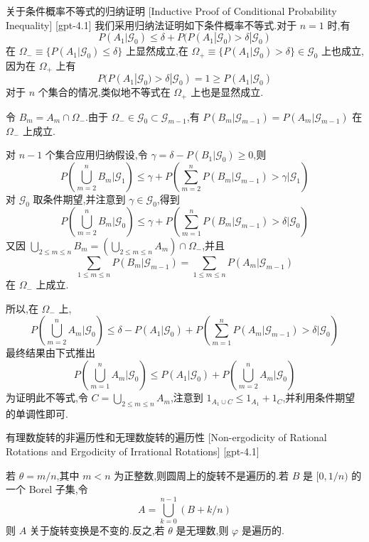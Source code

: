 \documentclass[UTF8]{ctexart}
\begin{document}
    \begin{prf}
        {关于条件概率不等式的归纳证明}
        [Inductive Proof of Conditional Probability Inequality]
        [gpt-4.1]
        我们采用归纳法证明如下条件概率不等式.对于 $n=1$ 时,有
\[
P ( A_1 | \mathcal{G}_0 ) \leq \delta + P ( P ( A_1 | \mathcal{G}_0 ) > \delta | \mathcal{G}_0 )
\]
在 $\Omega_{-} \equiv \{ P ( A_1 | \mathcal{G}_0 ) \leq \delta \}$ 上显然成立,在 $\Omega_{+} \equiv \{ P ( A_1 | \mathcal{G}_0 ) > \delta \} \in \mathcal{G}_0$ 上也成立,因为在 $\Omega_{+}$ 上有
\[
P ( P ( A_1 | \mathcal{G}_0 ) > \delta | \mathcal{G}_0 ) = 1 \geq P ( A_1 | \mathcal{G}_0 )
\]
对于 $n$ 个集合的情况,类似地不等式在 $\Omega_{+}$ 上也是显然成立.

令 $B_m = A_m \cap \Omega_{-}$.由于 $\Omega_{-} \in \mathcal{G}_0 \subset \mathcal{G}_{m-1}$,有 $P ( B_m | \mathcal{G}_{m-1} ) = P ( A_m | \mathcal{G}_{m-1} )$ 在 $\Omega_{-}$ 上成立.

对 $n-1$ 个集合应用归纳假设,令 $\gamma = \delta - P ( B_1 | \mathcal{G}_0 ) \geq 0$,则
\[
P \left( \bigcup_{m=2}^n B_m \bigg| \mathcal{G}_1 \right) \leq \gamma + P \left( \sum_{m=2}^n P ( B_m | \mathcal{G}_{m-1} ) > \gamma \bigg| \mathcal{G}_1 \right)
\]
对 $\mathcal{G}_0$ 取条件期望,并注意到 $\gamma \in \mathcal{G}_0$,得到
\[
P \left( \bigcup_{m=2}^n B_m \bigg| \mathcal{G}_0 \right) \leq \gamma + P \left( \sum_{m=1}^n P ( B_m | \mathcal{G}_{m-1} ) > \delta \bigg| \mathcal{G}_0 \right)
\]
又因 $\bigcup_{2 \leq m \leq n} B_m = \left( \bigcup_{2 \leq m \leq n} A_m \right) \cap \Omega_{-}$,并且
\[
\sum_{1 \leq m \leq n} P ( B_m | \mathcal{G}_{m-1} ) = \sum_{1 \leq m \leq n} P ( A_m | \mathcal{G}_{m-1} )
\]
在 $\Omega_{-}$ 上成立.

所以,在 $\Omega_{-}$ 上,
\[
P \left( \bigcup_{m=2}^n A_m \bigg| \mathcal{G}_0 \right) \leq \delta - P ( A_1 | \mathcal{G}_0 ) + P \left( \sum_{m=1}^n P ( A_m | \mathcal{G}_{m-1} ) > \delta \bigg| \mathcal{G}_0 \right)
\]
最终结果由下式推出
\[
P \left( \bigcup_{m=1}^n A_m \bigg| \mathcal{G}_0 \right) \leq P ( A_1 | \mathcal{G}_0 ) + P \left( \bigcup_{m=2}^n A_m \bigg| \mathcal{G}_0 \right)
\]
为证明此不等式,令 $C = \bigcup_{2 \leq m \leq n} A_m$,注意到 $1_{A_1 \cup C} \leq 1_{A_1} + 1_C$,并利用条件期望的单调性即可.

    \end{prf}
    
    
    
    \begin{thm}
        {有理数旋转的非遍历性和无理数旋转的遍历性}
        [Non-ergodicity of Rational Rotations and Ergodicity of Irrational Rotations]
        [gpt-4.1]
        
若 $\theta = m / n$,其中 $m < n$ 为正整数,则圆周上的旋转不是遍历的.若 $B$ 是 $[0, 1 / n)$ 的一个 Borel 子集,令
\[
A = \bigcup_{k=0}^{n-1} (B + k / n)
\]
则 $A$ 关于旋转变换是不变的.反之,若 $\theta$ 是无理数,则 $\varphi$ 是遍历的.

    \end{thm}
    
\end{document}
